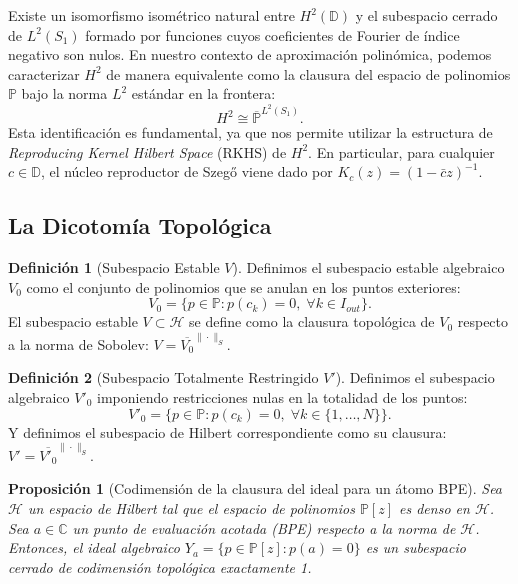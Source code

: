 \documentclass[12pt,a4paper]{article}
\newtheorem{proposition}{Proposición}
\theoremstyle{definition}
\newtheorem{definition}{Definición}
\theoremstyle{remark}
\begin{document}
Existe un isomorfismo isométrico natural entre $H^2(\mathbb{D})$ y el subespacio cerrado de $L^2(S_1)$ formado por funciones cuyos coeficientes de Fourier de índice negativo son nulos. En nuestro contexto de aproximación polinómica, podemos caracterizar $H^2$ de manera equivalente como la clausura del espacio de polinomios $\mathbb{P}$ bajo la norma $L^2$ estándar en la frontera:
$$ H^2 \cong \overline{\mathbb{P}}^{L^2(S_1)}. $$
Esta identificación es fundamental, ya que nos permite utilizar la estructura de \textit{Reproducing Kernel Hilbert Space} (RKHS) de $H^2$. En particular, para cualquier $c \in \mathbb{D}$, el núcleo reproductor de Szegő viene dado por $K_c(z) = (1-\bar{c}z)^{-1}$.

\subsection{La Dicotomía Topológica}

\begin{definition}[Subespacio Estable $V$]
	Definimos el subespacio estable algebraico $V_0$ como el conjunto de polinomios que se anulan en los puntos exteriores:
	\begin{equation}
		V_0 = \{p \in \mathbb{P} : p(c_k) = 0, \; \forall k \in I_{out}\}.
	\end{equation}
	El subespacio estable $V \subset \mathcal{H}$ se define como la clausura topológica de $V_0$ respecto a la norma de Sobolev: $V = \overline{V_0}^{\|\cdot\|_S}$.
\end{definition}

\begin{definition}[Subespacio Totalmente Restringido $V'$]
	Definimos el subespacio algebraico $V'_0$ imponiendo restricciones nulas en la totalidad de los puntos:
	\begin{equation}
		V'_0 = \{p \in \mathbb{P} : p(c_k) = 0, \; \forall k \in \{1, \dots, N\}\}.
	\end{equation}
	Y definimos el subespacio de Hilbert correspondiente como su clausura: $V' = \overline{V'_0}^{\|\cdot\|_S}$.
\end{definition}

\begin{proposition}[Codimensión de la clausura del ideal para un átomo BPE]
	Sea $\mathcal{H}$ un espacio de Hilbert tal que el espacio de polinomios $\mathbb{P}[z]$ es denso en $\mathcal{H}$. Sea $a \in \mathbb{C}$ un punto de evaluación acotada (BPE) respecto a la norma de $\mathcal{H}$. Entonces, el ideal algebraico $Y_a = \{p \in \mathbb{P}[z] : p(a) = 0\}$ es un subespacio cerrado de codimensión topológica exactamente 1.
\end{proposition}
\end{document}
